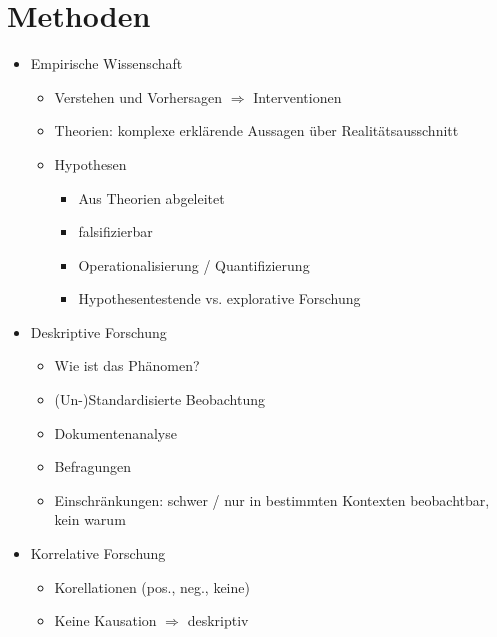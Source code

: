 \documentclass[11pt, paper=a4, twocolumn]{scrartcl}
\begin{document}
	\section{Methoden}
		\begin{itemize}
			\item Empirische Wissenschaft
				\begin{itemize}
					\item Verstehen und Vorhersagen $\Rightarrow$ Interventionen
					\item Theorien: komplexe erklärende Aussagen über Realitätsausschnitt
					\item Hypothesen
						\begin{itemize}
							\item Aus Theorien abgeleitet
							\item falsifizierbar
							\item Operationalisierung / Quantifizierung
							\item Hypothesentestende vs. explorative Forschung
						\end{itemize}
				\end{itemize}

			\item Deskriptive Forschung
				\begin{itemize}
					\item Wie ist das Phänomen?
					\item (Un-)Standardisierte Beobachtung
					\item Dokumentenanalyse
					\item Befragungen
					\item Einschränkungen: schwer / nur in bestimmten Kontexten beobachtbar, kein warum
				\end{itemize}

			\item Korrelative Forschung
				\begin{itemize}
					\item Korellationen (pos., neg., keine)
					\item Keine Kausation $\Rightarrow$ deskriptiv
				\end{itemize}


\end{itemize}
\end{document}
